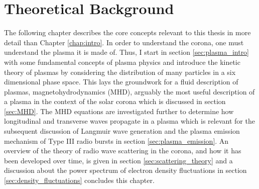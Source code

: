 \doublespacing
\chapter{Theoretical Background}
\label{chap:theory}
The following chapter describes the core concepts relevant to this thesis in more detail than Chapter \ref{chap:intro}. In order to understand the corona, one must understand the plasma it is made of. Thus, I start in section \ref{sec:plasma_intro} with some fundamental concepts of plasma physics and introduce the kinetic theory of plasmas by considering the distribution of many particles in a six dimensional phase space. This lays the groundwork for a fluid description of plasmas, magnetohydrodynamics (MHD), arguably the most useful description of a plasma in the context of the solar corona which is discussed in section \ref{sec:MHD}. The MHD equations are investigated further to determine how longitudinal and transverse waves propagate in a plasma which is relevant for the subsequent discussion of Langmuir wave generation and the plasma emission mechanism of Type III radio bursts in section \ref{sec:plasma_emission}. An overview of the theory of radio wave scattering in the corona, and how it has been developed over time, is given in section \ref{sec:scattering_theory} and a discussion about the power spectrum of electron density fluctuations in section \ref{sec:density_fluctuations} concludes this chapter.


